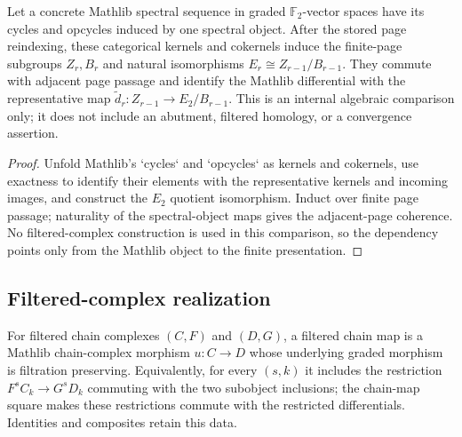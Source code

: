 \begin{proposition}
  \label{prop:categorical-elementwise-comparison}
  \notready
  Let a concrete Mathlib spectral sequence in graded $\mathbb F_2$-vector
  spaces have its cycles and opcycles induced by one spectral object.  After
  the stored page reindexing, these categorical kernels and cokernels induce
  the finite-page subgroups $Z_r,B_r$ and natural isomorphisms
  $E_r\cong Z_{r-1}/B_{r-1}$.  They commute with adjacent page passage and
  identify the Mathlib differential with the representative map
  $\widetilde d_r:Z_{r-1}\to E_2/B_{r-1}$.  This is an internal algebraic
  comparison only; it does not include an abutment, filtered homology, or a
  convergence assertion.
\end{proposition}

\begin{proof}
  Unfold Mathlib's `cycles` and `opcycles` as kernels and cokernels, use
  exactness to identify their elements with the representative kernels and
  incoming images, and construct the $E_2$ quotient isomorphism.  Induct over
  finite page passage; naturality of the spectral-object maps gives the
  adjacent-page coherence.  No filtered-complex construction is used in this
  comparison, so the dependency points only from the Mathlib object to the
  finite presentation.
\end{proof}

\subsection{Filtered-complex realization}

\begin{definition}
  \label{def:filtered-chain-map}
  \leanok
  For filtered chain complexes $(C,F)$ and $(D,G)$, a filtered chain map is a
  Mathlib chain-complex morphism $u:C\to D$ whose underlying graded morphism is
  filtration preserving.  Equivalently, for every $(s,k)$ it includes the
  restriction $F^sC_k\to G^sD_k$ commuting with the two subobject inclusions;
  the chain-map square makes these restrictions commute with the restricted
  differentials.  Identities and composites retain this data.
\end{definition}

